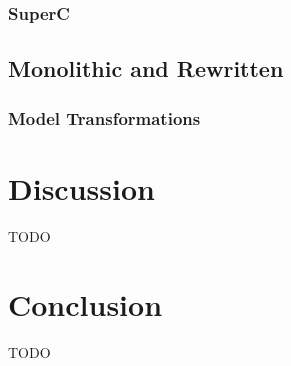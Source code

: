 \documentclass[11pt, english]{article}
\begin{document}
\subsubsection{SuperC}

\subsection{Monolithic and Rewritten}

\subsubsection{Model Transformations}

\section{Discussion}
TODO

\section{Conclusion}
TODO


 
\end{document}
